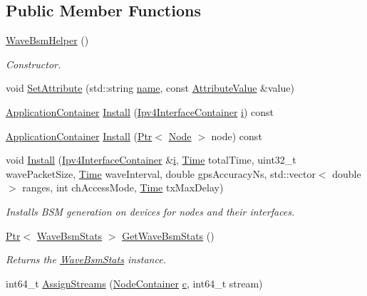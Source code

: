 \subsection*{Public Member Functions}
\begin{DoxyCompactItemize}
\item 
\hyperlink{classns3_1_1WaveBsmHelper_abc6aa7d288bd472099851dca1d2712ea}{Wave\+Bsm\+Helper} ()
\begin{DoxyCompactList}\small\item\em Constructor. \end{DoxyCompactList}\item 
void \hyperlink{classns3_1_1WaveBsmHelper_a6d1e2d3b3698cf3c32148b61ab17e340}{Set\+Attribute} (std\+::string \hyperlink{generate__test__data__lte__spectrum__model_8m_ab74e6bf80237ddc4109968cedc58c151}{name}, const \hyperlink{classns3_1_1AttributeValue}{Attribute\+Value} \&value)
\item 
\hyperlink{classns3_1_1ApplicationContainer}{Application\+Container} \hyperlink{classns3_1_1WaveBsmHelper_a1f30ea7ae1ed3d1f10760b876b69b349}{Install} (\hyperlink{classns3_1_1Ipv4InterfaceContainer}{Ipv4\+Interface\+Container} \hyperlink{lte__uplink__power__control_8m_a6f6ccfcf58b31cb6412107d9d5281426}{i}) const 
\item 
\hyperlink{classns3_1_1ApplicationContainer}{Application\+Container} \hyperlink{classns3_1_1WaveBsmHelper_a002189b718303e00d9908bc3afd7333c}{Install} (\hyperlink{classns3_1_1Ptr}{Ptr}$<$ \hyperlink{classns3_1_1Node}{Node} $>$ node) const 
\item 
void \hyperlink{classns3_1_1WaveBsmHelper_ab7cdfcc0ff2b92c913b1586cdb240960}{Install} (\hyperlink{classns3_1_1Ipv4InterfaceContainer}{Ipv4\+Interface\+Container} \&\hyperlink{lte__uplink__power__control_8m_a6f6ccfcf58b31cb6412107d9d5281426}{i}, \hyperlink{classns3_1_1Time}{Time} total\+Time, uint32\+\_\+t wave\+Packet\+Size, \hyperlink{classns3_1_1Time}{Time} wave\+Interval, double gps\+Accuracy\+Ns, std\+::vector$<$ double $>$ ranges, int ch\+Access\+Mode, \hyperlink{classns3_1_1Time}{Time} tx\+Max\+Delay)
\begin{DoxyCompactList}\small\item\em Installs B\+SM generation on devices for nodes and their interfaces. \end{DoxyCompactList}\item 
\hyperlink{classns3_1_1Ptr}{Ptr}$<$ \hyperlink{classns3_1_1WaveBsmStats}{Wave\+Bsm\+Stats} $>$ \hyperlink{classns3_1_1WaveBsmHelper_a7b7442d597cc104a22c8c4bef6c98c6e}{Get\+Wave\+Bsm\+Stats} ()
\begin{DoxyCompactList}\small\item\em Returns the \hyperlink{classns3_1_1WaveBsmStats}{Wave\+Bsm\+Stats} instance. \end{DoxyCompactList}\item 
int64\+\_\+t \hyperlink{classns3_1_1WaveBsmHelper_ae70eefd2d78ae539e65ea27468a525d2}{Assign\+Streams} (\hyperlink{classns3_1_1NodeContainer}{Node\+Container} \hyperlink{mmwave_2model_2fading-traces_2fading__trace__generator_8m_ae0323a9039add2978bf5b49550572c7c}{c}, int64\+\_\+t stream)
\end{DoxyCompactItemize}
